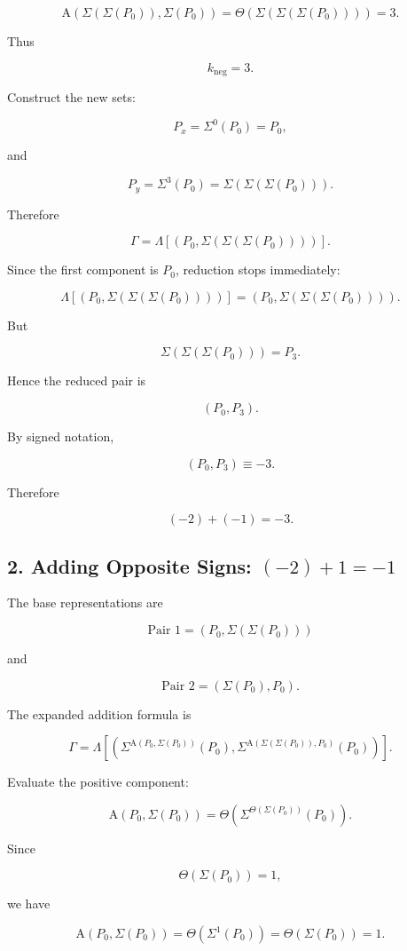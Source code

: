 \documentclass[12pt]{article}
\newcommand{\Alpha}{\mathrm{A}}
\begin{document}
\[
\Alpha(\Sigma(\Sigma(P_0)),\Sigma(P_0))
=
\Theta(\Sigma(\Sigma(\Sigma(P_0))))
=
3.
\]

Thus

\[
k_{\mathrm{neg}}=3.
\]

Construct the new sets:

\[
P_x
=
\Sigma^0(P_0)
=
P_0,
\]

and

\[
P_y
=
\Sigma^3(P_0)
=
\Sigma(\Sigma(\Sigma(P_0))).
\]

Therefore

\[
\Gamma
=
\Lambda[(P_0,\Sigma(\Sigma(\Sigma(P_0))))].
\]

Since the first component is \(P_0\), reduction stops immediately:

\[
\Lambda[(P_0,\Sigma(\Sigma(\Sigma(P_0))))]
=
(P_0,\Sigma(\Sigma(\Sigma(P_0)))).
\]

But

\[
\Sigma(\Sigma(\Sigma(P_0)))=P_3.
\]

Hence the reduced pair is

\[
(P_0,P_3).
\]

By signed notation,

\[
(P_0,P_3)\equiv-3.
\]

Therefore

\[
\boxed{
(-2)+(-1)=-3.
}
\]

\subsection*{2. Adding Opposite Signs: \((-2)+1=-1\)}

The base representations are

\[
\text{Pair 1}
=
(P_0,\Sigma(\Sigma(P_0)))
\]

and

\[
\text{Pair 2}
=
(\Sigma(P_0),P_0).
\]

The expanded addition formula is

\[
\Gamma
=
\Lambda\left[
\left(
\Sigma^{\Alpha(P_0,\Sigma(P_0))}(P_0),
\Sigma^{\Alpha(\Sigma(\Sigma(P_0)),P_0)}(P_0)
\right)
\right].
\]

Evaluate the positive component:

\[
\Alpha(P_0,\Sigma(P_0))
=
\Theta\left(
\Sigma^{\Theta(\Sigma(P_0))}(P_0)
\right).
\]

Since

\[
\Theta(\Sigma(P_0))=1,
\]

we have

\[
\Alpha(P_0,\Sigma(P_0))
=
\Theta(\Sigma^1(P_0))
=
\Theta(\Sigma(P_0))
=
1.
\]
\end{document}
